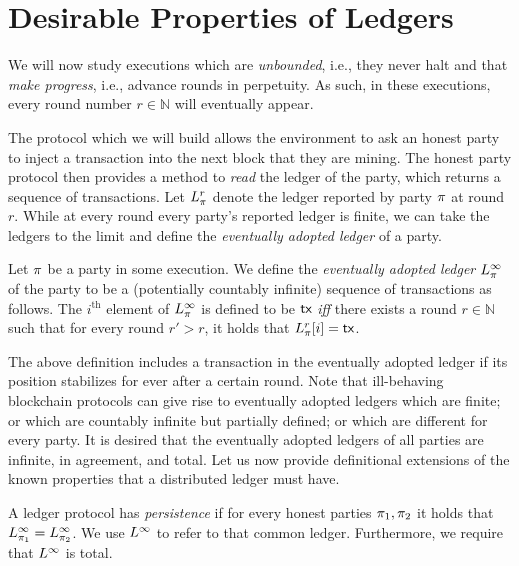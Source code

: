 \section{Desirable Properties of Ledgers}

We will now study executions which are \emph{unbounded}, i.e., they never halt
and that \emph{make progress}, i.e., advance rounds in perpetuity. As such, in
these executions, every round number $r \in \mathbb{N}$ will eventually appear.

The protocol which we will build allows the environment to ask an honest party
to inject a transaction into the next block that they are mining. The honest
party protocol then provides a method to \emph{read} the ledger of the party,
which returns a sequence of transactions. Let $L_\pi^r$ denote the
ledger reported by party $\pi$ at round $r$. While at every round every
party's reported ledger is finite, we can take the ledgers to the limit and
define the \emph{eventually adopted ledger} of a party.

\begin{definition}
  Let $\pi$ be a party in some execution. We define the \emph{eventually
  adopted ledger} $L_\pi^\infty$ of the party to be
  a (potentially countably infinite) sequence of transactions as follows. The
  $i^\text{th}$ element of $L_\pi^\infty$ is defined to be $\textsf{tx}$
  \emph{iff} there exists a round $r \in \mathbb{N}$ such that for every round
  $r' > r$, it holds that $L_\pi^r[i] = \textsf{tx}$.
\end{definition}

The above definition includes a transaction in the eventually adopted ledger if
its position stabilizes for ever after a certain round. Note that ill-behaving
blockchain protocols can give rise to eventually adopted ledgers which are
finite; or which are countably infinite but partially defined; or which are
different for every party. It is desired that the eventually adopted ledgers of
all parties are infinite, in agreement, and total. Let us now provide
definitional extensions of the known properties that a distributed ledger must
have.

\begin{definition}[Persistence]
  A ledger protocol has \emph{persistence} if for every honest parties
  $\pi_1, \pi_2$ it holds that
  $L_{\pi_1}^\infty = L_{\pi_2}^\infty$. We use
  $L^\infty$ to refer to that common ledger. Furthermore, we require that
  $L^\infty$ is total.
\end{definition}


